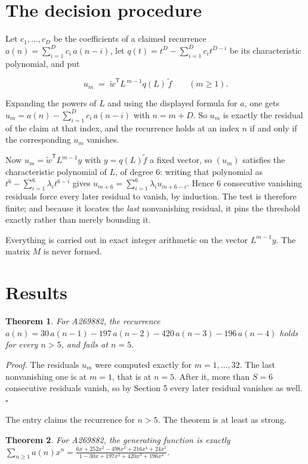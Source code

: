 \documentclass[11pt]{article}
\newtheorem{theorem}{Theorem}
\theoremstyle{definition}
\begin{document}
\section{The decision procedure}

Let $c_1,\dots,c_D$ be the coefficients of a claimed recurrence $a(n) = \sum_{i=1}^{D} c_i\,a(n-i)$, let $q(t) = t^{D} - \sum_{i=1}^{D} c_i t^{D-i}$ be its characteristic polynomial, and put

\[u_m \;=\; \tilde w^{\mathsf T} L^{\,m-1} q(L)\,\tilde f \qquad (m \ge 1).\]

Expanding the powers of $L$ and using the displayed formula for $a$, one gets $u_m = a(n) - \sum_{i=1}^{D} c_i\,a(n-i)$ with $n = m + D$. So $u_m$ is exactly the residual of the claim at that index, and the recurrence holds at an index $n$ if and only if the corresponding $u_m$ vanishes.

Now $u_m = \tilde w^{\mathsf T} L^{m-1} y$ with $y = q(L)\tilde f$ a fixed vector, so $(u_m)$ satisfies the characteristic polynomial of $L$, of degree $6$: writing that polynomial as $t^{6} - \sum_{i=1}^{6} \lambda_i t^{6-i}$ gives $u_{m+6} = \sum_{i=1}^{6} \lambda_i u_{m+6-i}$. Hence $6$ consecutive vanishing residuals force every later residual to vanish, by induction. The test is therefore finite; and because it locates the {\itshape last} nonvanishing residual, it pins the threshold exactly rather than merely bounding it.

Everything is carried out in exact integer arithmetic on the vector $L^{m-1}y$. The matrix $M$ is never formed.

\section{Results}

\begin{theorem} For A269882, the recurrence $a(n) = 30\,a(n-1) - 197\,a(n-2) - 420\,a(n-3) - 196\,a(n-4)$ holds for every $n > 5$, and fails at $n = 5$.\end{theorem}

{\itshape Proof.} The residuals $u_m$ were computed exactly for $m = 1,\dots,32$. The last nonvanishing one is at $m = 1$, that is at $n = 5$. After it, more than $S = 6$ consecutive residuals vanish, so by Section 5 every later residual vanishes as well. $\square$

The entry claims the recurrence for $n > 5$. The theorem is at least as strong.

\begin{theorem} For A269882, the generating function is exactly $\sum_{n\ge 1} a(n)x^n = \frac{6x + 252x^{2} - 498x^{3} + 216x^{4} + 24x^{5}}{1 - 30x + 197x^{2} + 420x^{3} + 196x^{4}}$.\end{theorem}
\end{document}
